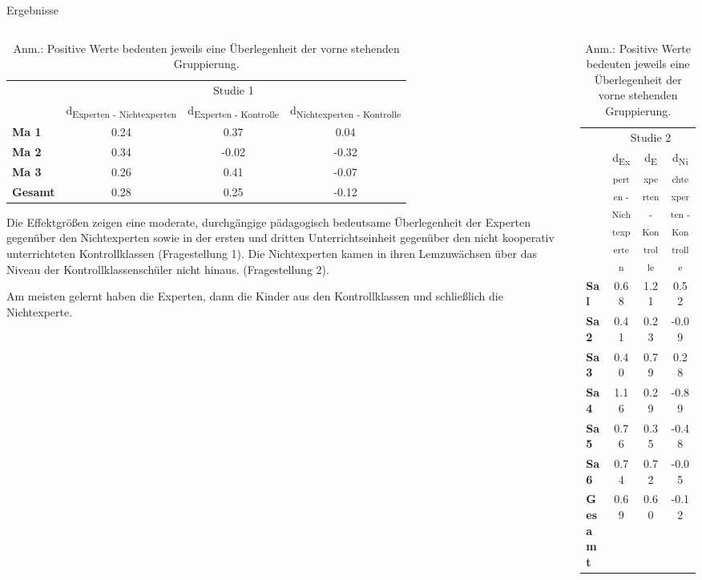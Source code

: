 \begin{block}{Ergebnisse} %
\begin{columns}[t,totalwidth=\twocolwid] %
\begin{column}{\onecolwid} %
\begin{table}
\begin{tabular}{lccc}
 & \multicolumn{3}{c}{Studie 1} \\
\cmidrule{2-4}
 & d\textsubscript{Experten - Nichtexperten} & d\textsubscript{Experten - Kontrolle} & d\textsubscript{Nichtexperten - Kontrolle} \\
\midrule 
\textbf{Ma 1} & 0.24 & 0.37 & 0.04 \\
\textbf{Ma 2} & 0.34 & -0.02 & -0.32 \\
\textbf{Ma 3} & 0.26 & 0.41 & -0.07 \\
\midrule 
\textbf{Gesamt} & 0.28 & 0.25 & -0.12 \\
\bottomrule
\end{tabular}
{\caption*{Anm.: Positive Werte bedeuten jeweils eine Überlegenheit der vorne stehenden Gruppierung.}}
\end{table}

\justifying
Die Effektgrößen zeigen eine moderate, durchgängige pädagogisch bedeutsame Überlegenheit der Experten gegenüber den Nichtexperten sowie in der ersten und dritten Unterrichtseinheit gegenüber den nicht kooperativ unterrichteten Kontrollklassen (Fragestellung 1). Die Nichtexperten kamen in ihren Lemzuwächsen über das Niveau der Kontrollklassenschüler nicht hinaus. (Fragestellung 2). 

Am meisten gelernt haben die Experten, dann die Kinder aus den Kontrollklassen und schließlich die Nichtexperte.

\end{column} %
\begin{column}{\onecolwid} %
\begin{table}
\begin{tabular}{lccc}
 & \multicolumn{3}{c}{Studie 2} \\
\cmidrule{2-4}
 & d\textsubscript{Experten - Nichtexperten} & d\textsubscript{Experten - Kontrolle} & d\textsubscript{Nichtexperten - Kontrolle} \\
\midrule 
\textbf{Sa l} & 0.68 & 1.21 & 0.52 \\
\textbf{Sa 2} & 0.41 & 0.23 & -0.09 \\
\textbf{Sa 3} & 0.40 & 0.79 & 0.28 \\
\textbf{Sa 4} & 1.16 & 0.29 & -0.89 \\
\textbf{Sa 5} & 0.76 & 0.35 & -0.48 \\
\textbf{Sa 6} & 0.74 & 0.72 & -0.05 \\
\midrule 
\textbf{Gesamt} & 0.69 & 0.60 & -0.12 \\
\bottomrule
\end{tabular}
{\caption*{Anm.: Positive Werte bedeuten jeweils eine Überlegenheit der vorne stehenden Gruppierung.}}
\end{table}


\end{column}
\end{columns}
\end{block}
